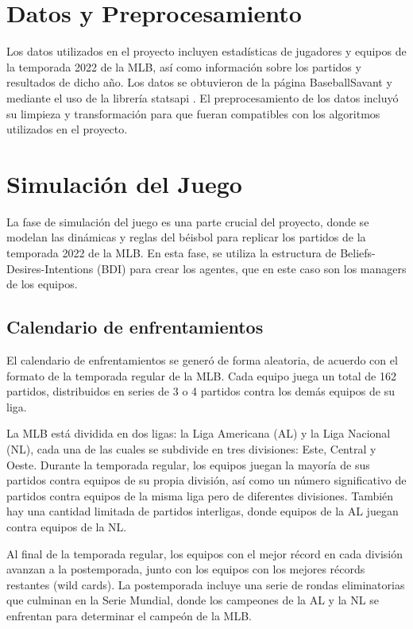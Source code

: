 \documentclass[runningheads]{llncs}
\begin{document}
\section{Datos y Preprocesamiento}
    Los datos utilizados en el proyecto incluyen estadísticas de jugadores y equipos de la temporada 2022 de la MLB, así como información sobre los partidos y resultados de dicho año. Los datos se obtuvieron de la página BaseballSavant \cite{baseballsavant} y mediante el uso de la librería statsapi \cite{statsapi}. El preprocesamiento de los datos incluyó su limpieza y transformación para que fueran compatibles con los algoritmos utilizados en el proyecto.

\section{Simulación del Juego}
    La fase de simulación del juego es una parte crucial del proyecto, donde se modelan las dinámicas y reglas del béisbol para replicar los partidos de la temporada 2022 de la MLB. En esta fase, se utiliza la estructura de Beliefs-Desires-Intentions (BDI) para crear los agentes, que en este caso son los managers de los equipos.

    \subsection{Calendario de enfrentamientos}
        El calendario de enfrentamientos se generó de forma aleatoria, de acuerdo con el formato de la temporada regular de la MLB. Cada equipo juega un total de 162 partidos, distribuidos en series de 3 o 4 partidos contra los demás equipos de su liga.

        La MLB está dividida en dos ligas: la Liga Americana (AL) y la Liga Nacional (NL), cada una de las cuales se subdivide en tres divisiones: Este, Central y Oeste. Durante la temporada regular, los equipos juegan la mayoría de sus partidos contra equipos de su propia división, así como un número significativo de partidos contra equipos de la misma liga pero de diferentes divisiones. También hay una cantidad limitada de partidos interligas, donde equipos de la AL juegan contra equipos de la NL.

        Al final de la temporada regular, los equipos con el mejor récord en cada división avanzan a la postemporada, junto con los equipos con los mejores récords restantes (wild cards). La postemporada incluye una serie de rondas eliminatorias que culminan en la Serie Mundial, donde los campeones de la AL y la NL se enfrentan para determinar el campeón de la MLB.
\end{document}

